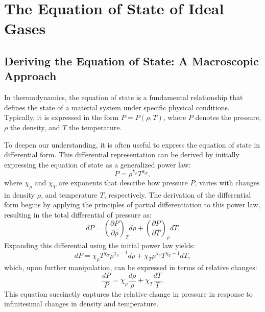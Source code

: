 \documentclass[main.tex]{subfiles}
\begin{document}
\chapter{The Equation of State of Ideal Gases}\label{apx:eos}
    {
        \minitoc
    }
\section{Deriving the Equation of State: A Macroscopic Approach}
In thermodynamics, the equation of state is a fundamental relationship that defines the state of a material system under specific physical conditions. Typically, it is expressed in the form $P=P(\rho,T)$, where $P$ denotes the pressure, $\rho$ the density, and $T$ the temperature. 

To deepen our understanding, it is often useful to express the equation of state in differential form.  This differential representation can be derived by initially expressing the equation of state as a generalized power law:
\begin{equation}
    P = \rho^{\chi_\rho} T^{\chi_T},
\end{equation}
where $\chi_\rho$ and $\chi_T$ are exponents that describe how pressure $P$, varies with changes in density $\rho$, and temperature $T$, respectively. The derivation of the differential form begins by applying the principles of partial differentiation to this power law, resulting in the total differential of pressure as:
\begin{equation*}
    dP = \left( \frac{\partial P}{\partial \rho} \right)_T d\rho + \left( \frac{\partial P}{\partial T} \right)_\rho dT.
\end{equation*}
Expanding this differential using the initial power law yields:
\begin{equation*}
    dP = \chi_\rho T^{\chi_T} \rho^{\chi_\rho - 1} d\rho +  \chi_T \rho^{\chi_\rho} T^{\chi_T - 1} dT,
\end{equation*}
which, upon further manipulation, can be expressed in terms of relative changes:
\begin{equation}
    \frac{dP}{P} = \chi_\rho \frac{d\rho}{\rho} + \chi_T \frac{dT}{T}.
\end{equation}
This equation succinctly captures the relative change in pressure in response to infinitesimal changes in density and temperature. 
\end{document}
